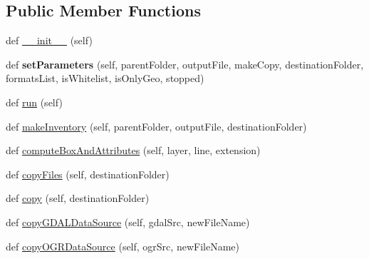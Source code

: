 \subsection*{Public Member Functions}
\begin{DoxyCompactItemize}
\item 
def \mbox{\hyperlink{class_dsg_tools_1_1_factories_1_1_thread_factory_1_1inventory_thread_1_1_inventory_thread_a126e84d23d245b3283bfa20432837a6b}{\+\_\+\+\_\+init\+\_\+\+\_\+}} (self)
\item 
\mbox{\label{class_dsg_tools_1_1_factories_1_1_thread_factory_1_1inventory_thread_1_1_inventory_thread_a9a28a9164e3a7145b49d1e8d32e097f3}} 
def {\bfseries set\+Parameters} (self, parent\+Folder, output\+File, make\+Copy, destination\+Folder, formats\+List, is\+Whitelist, is\+Only\+Geo, stopped)
\item 
def \mbox{\hyperlink{class_dsg_tools_1_1_factories_1_1_thread_factory_1_1inventory_thread_1_1_inventory_thread_aa1de63f12022456d0adfcad39c8e7c12}{run}} (self)
\item 
def \mbox{\hyperlink{class_dsg_tools_1_1_factories_1_1_thread_factory_1_1inventory_thread_1_1_inventory_thread_a3a79e7cbac8812c3ee82fc4cdf405149}{make\+Inventory}} (self, parent\+Folder, output\+File, destination\+Folder)
\item 
def \mbox{\hyperlink{class_dsg_tools_1_1_factories_1_1_thread_factory_1_1inventory_thread_1_1_inventory_thread_af49e888ae1d1e120bebcdf620730c1b1}{compute\+Box\+And\+Attributes}} (self, layer, line, extension)
\item 
def \mbox{\hyperlink{class_dsg_tools_1_1_factories_1_1_thread_factory_1_1inventory_thread_1_1_inventory_thread_a3c6dd527c4ca93af4a542d505ebe99f6}{copy\+Files}} (self, destination\+Folder)
\item 
def \mbox{\hyperlink{class_dsg_tools_1_1_factories_1_1_thread_factory_1_1inventory_thread_1_1_inventory_thread_a1dd2d109fee4f8015236e57b54caea5a}{copy}} (self, destination\+Folder)
\item 
def \mbox{\hyperlink{class_dsg_tools_1_1_factories_1_1_thread_factory_1_1inventory_thread_1_1_inventory_thread_a6e4afaa58fc22a337235d79b6aa06f6d}{copy\+G\+D\+A\+L\+Data\+Source}} (self, gdal\+Src, new\+File\+Name)
\item 
def \mbox{\hyperlink{class_dsg_tools_1_1_factories_1_1_thread_factory_1_1inventory_thread_1_1_inventory_thread_acbdf2851ff289aae0cd231501bec641b}{copy\+O\+G\+R\+Data\+Source}} (self, ogr\+Src, new\+File\+Name)

\end{DoxyCompactItemize}
